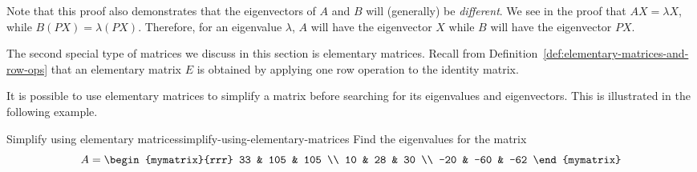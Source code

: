 Note that this proof also demonstrates that the eigenvectors of $A$ and $B$ will (generally) be {\em different\em}.
We see in the proof that $AX = \lambda X$, while $B (PX)=\lambda (PX)$. Therefore,
for an eigenvalue $\lambda$, $A$ will have the eigenvector $X$ while $B$ will have the eigenvector $PX$. 


The second special type of matrices we discuss in this section is elementary matrices.  
Recall from Definition~\ref{def:elementary-matrices-and-row-ops} that an elementary matrix $E$ is obtained by applying
one row operation to the identity matrix. 

It is possible to use elementary matrices to simplify a matrix before searching for its
eigenvalues and eigenvectors. This is illustrated in the following
example.

\begin{example}{Simplify using elementary matrices}{simplify-using-elementary-matrices}
Find the eigenvalues for the matrix
\begin{equation*}
A = \begin{mymatrix}{rrr}
 33 & 105 & 105 \\
 10 &  28 & 30 \\
-20 & -60 & -62
\end{mymatrix}
\end{equation*}
\end{example}

